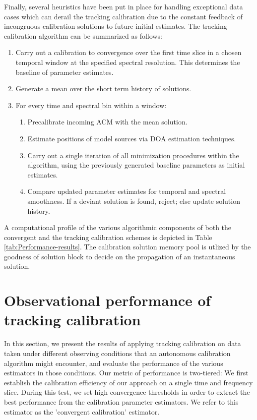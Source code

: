 \documentclass{aa}
\begin{document}
Finally, several heuristics have been put in place for handling exceptional data
cases which can derail the tracking  calibration due to the constant feedback of
incongruous  calibration solutions  to future  initial estimates.   The tracking
calibration algorithm can be summarized as follows:
\begin{enumerate}
\item Carry  out a  calibration to convergence  over the  first time slice  in a
  chosen temporal  window at the specified spectral  resolution. This determines
  the baseline of parameter estimates.
\item Generate a mean over the short term history of solutions.
\item For every time and spectral bin within a window:
  \begin{enumerate}
    \item Precalibrate incoming ACM with the mean solution.
    \item Estimate positions of model sources via DOA estimation techniques.
    \item Carry out a single iteration of all minimization procedures within the
      algorithm, using  the previously generated baseline  parameters as initial
      estimates.
    \item  Compare  updated  parameter   estimates  for  temporal  and  spectral
      smoothness.  If a deviant solution  is found, reject; else update solution
      history.
  \end{enumerate}
\end{enumerate}

A  computational profile  of  the  various algorithmic  components  of both  the
convergent  and   the  tracking  calibration   schemes  is  depicted   in  Table
\ref{tab:Performance-results}.  The calibration  solution memory pool is utlized
by  the  goodness  of  solution  block  to  decide  on  the  propagation  of  an
instantaneous solution.

\section{\label{sec:Performance-of-tracking}Observational performance of tracking calibration}


In this section, we present the results of applying tracking calibration on data
taken  under  different  observing  conditions that  an  autonomous  calibration
algorithm  might  encounter,  and   evaluate  the  performance  of  the  various
estimators in  those conditions.   Our metric of  performance is  two-tiered: We
first establish the calibration efficiency of  our approach on a single time and
frequency slice. During  this test, we set high  convergence thresholds in order
to extract the  best performance from the calibration  parameter estimators.  We
refer to this estimator as the 'convergent calibration' estimator.
\end{document}
